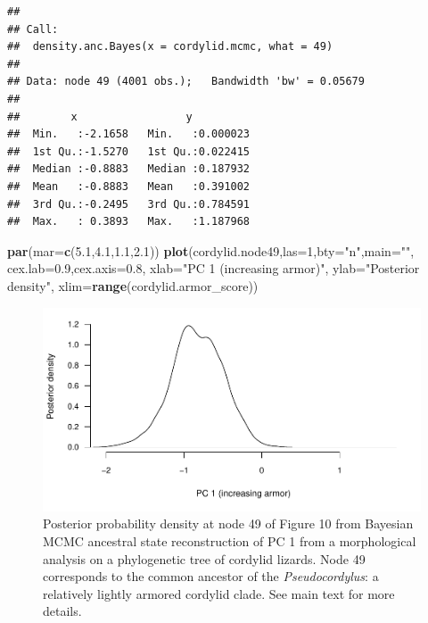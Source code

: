 \documentclass[fleqn,10pt,lineno]{wlpeerj} %
\newenvironment{Shaded}{\begin{snugshade}}{\end{snugshade}}
\newcommand{\AttributeTok}[1]{\textcolor[rgb]{0.13,0.29,0.53}{#1}}
\newcommand{\DecValTok}[1]{\textcolor[rgb]{0.00,0.00,0.81}{#1}}
\newcommand{\FloatTok}[1]{\textcolor[rgb]{0.00,0.00,0.81}{#1}}
\newcommand{\FunctionTok}[1]{\textcolor[rgb]{0.13,0.29,0.53}{\textbf{#1}}}
\newcommand{\NormalTok}[1]{#1}
\newcommand{\StringTok}[1]{\textcolor[rgb]{0.31,0.60,0.02}{#1}}
\begin{document}
\begin{verbatim}
## 
## Call:
##  density.anc.Bayes(x = cordylid.mcmc, what = 49)
## 
## Data: node 49 (4001 obs.);   Bandwidth 'bw' = 0.05679
## 
##        x                 y           
##  Min.   :-2.1658   Min.   :0.000023  
##  1st Qu.:-1.5270   1st Qu.:0.022415  
##  Median :-0.8883   Median :0.187932  
##  Mean   :-0.8883   Mean   :0.391002  
##  3rd Qu.:-0.2495   3rd Qu.:0.784591  
##  Max.   : 0.3893   Max.   :1.187968
\end{verbatim}

\begin{Shaded}
\begin{Highlighting}[]
\FunctionTok{par}\NormalTok{(}\AttributeTok{mar=}\FunctionTok{c}\NormalTok{(}\FloatTok{5.1}\NormalTok{,}\FloatTok{4.1}\NormalTok{,}\FloatTok{1.1}\NormalTok{,}\FloatTok{2.1}\NormalTok{))}
\FunctionTok{plot}\NormalTok{(cordylid.node49,}\AttributeTok{las=}\DecValTok{1}\NormalTok{,}\AttributeTok{bty=}\StringTok{"n"}\NormalTok{,}\AttributeTok{main=}\StringTok{""}\NormalTok{,}
  \AttributeTok{cex.lab=}\FloatTok{0.9}\NormalTok{,}\AttributeTok{cex.axis=}\FloatTok{0.8}\NormalTok{,}
  \AttributeTok{xlab=}\StringTok{"PC 1 (increasing armor)"}\NormalTok{,}
  \AttributeTok{ylab=}\StringTok{"Posterior density"}\NormalTok{,}
  \AttributeTok{xlim=}\FunctionTok{range}\NormalTok{(cordylid.armor\_score))}
\end{Highlighting}
\end{Shaded}

\begin{figure}
\includegraphics[width=1\linewidth]{Revell.phytools-v2_peerj_files/figure-latex/cordylid-pd-1} \caption{Posterior probability density at node 49 of Figure 10 from Bayesian MCMC ancestral state reconstruction of PC 1 from a morphological analysis on a phylogenetic tree of cordylid lizards. Node 49 corresponds to the common ancestor of the \textit{Pseudocordylus}: a relatively lightly armored cordylid clade. See main text for more details.}\label{fig:cordylid-pd}
\end{figure}
\end{document}
